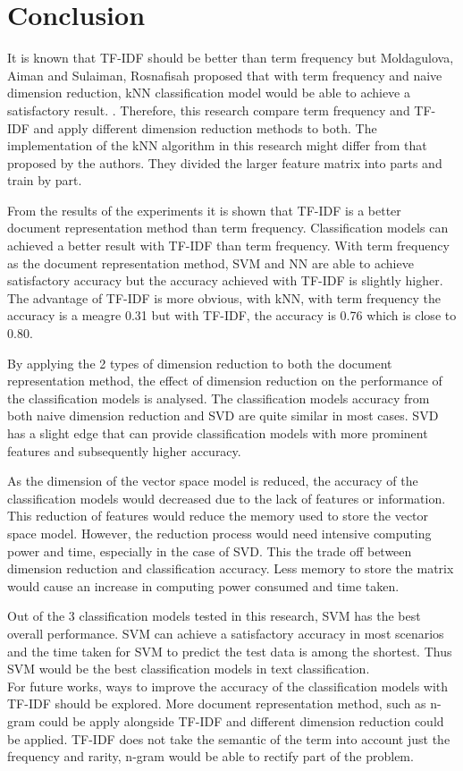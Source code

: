 \chapter{Conclusion}
It is known that TF-IDF should be better than term frequency but Moldagulova, Aiman and Sulaiman, Rosnafisah proposed that with term frequency and naive dimension reduction, kNN classification model would be able to achieve a satisfactory result. \cite{knnVectorSpaceReduction}. Therefore, this research compare term frequency and TF-IDF and apply different dimension reduction methods to both. The implementation of the kNN algorithm in this research might differ from that proposed by the authors. They divided the larger feature matrix into parts and train by part.

From the results of the experiments it is shown that TF-IDF is a better document representation method than term frequency. Classification models can achieved a better result with TF-IDF than term frequency.
With term frequency as the document representation method, SVM and NN are able to achieve satisfactory accuracy but the accuracy achieved with TF-IDF is slightly higher. The advantage of TF-IDF is more obvious, with kNN, with term frequency the accuracy is a meagre 0.31 but with TF-IDF, the accuracy is 0.76 which is close to 0.80.

By applying the 2 types of dimension reduction to both the document representation method, the effect of dimension reduction on the performance of the classification models is analysed. The classification models accuracy from both naive dimension reduction and SVD are quite similar in most cases. SVD has a slight edge that can provide classification models with more prominent features and subsequently higher accuracy.

As the dimension of the vector space model is reduced, the accuracy of the classification models would decreased due to the lack of features or information. This reduction of features would reduce the memory used to store the vector space model. However, the reduction process would need intensive computing power and time, especially in the case of SVD. This the trade off between dimension reduction and classification accuracy. Less memory to store the matrix would cause an increase in computing power consumed and time taken.

Out of the 3 classification models tested in this research, SVM has the best overall performance. SVM can achieve a satisfactory accuracy in most scenarios and the time taken for SVM to predict the test data is among the shortest. Thus SVM would be the best classification models in text classification.\\

For future works, ways to improve the accuracy of the classification models with TF-IDF should be explored. More document representation method, such as n-gram could be apply alongside TF-IDF and different dimension reduction could be applied. TF-IDF does not take the semantic of the term into account just the frequency and rarity, n-gram would be able to rectify part of the problem.